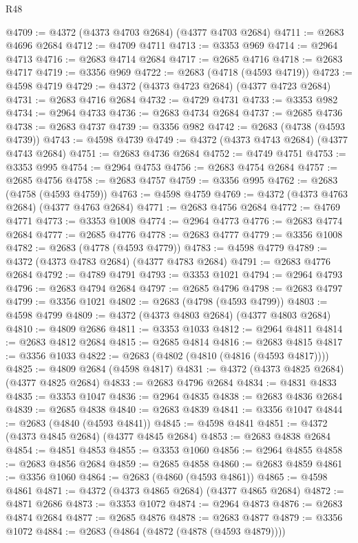 \begin{lexlean}{R48}
\begin{coremodule}
@4709 := @4372 (@4373 @4703 @2684) (@4377 @4703 @2684)
@4711 := @2683 @4696 @2684
@4712 := @4709 @4711
@4713 := @3353 @969
@4714 := @2964 @4713
@4716 := @2683 @4714 @2684
@4717 := @2685 @4716
@4718 := @2683 @4717
@4719 := @3356 @969
@4722 := @2683 (@4718 (@4593 @4719))
@4723 := @4598 @4719
@4729 := @4372 (@4373 @4723 @2684) (@4377 @4723 @2684)
@4731 := @2683 @4716 @2684
@4732 := @4729 @4731
@4733 := @3353 @982
@4734 := @2964 @4733
@4736 := @2683 @4734 @2684
@4737 := @2685 @4736
@4738 := @2683 @4737
@4739 := @3356 @982
@4742 := @2683 (@4738 (@4593 @4739))
@4743 := @4598 @4739
@4749 := @4372 (@4373 @4743 @2684) (@4377 @4743 @2684)
@4751 := @2683 @4736 @2684
@4752 := @4749 @4751
@4753 := @3353 @995
@4754 := @2964 @4753
@4756 := @2683 @4754 @2684
@4757 := @2685 @4756
@4758 := @2683 @4757
@4759 := @3356 @995
@4762 := @2683 (@4758 (@4593 @4759))
@4763 := @4598 @4759
@4769 := @4372 (@4373 @4763 @2684) (@4377 @4763 @2684)
@4771 := @2683 @4756 @2684
@4772 := @4769 @4771
@4773 := @3353 @1008
@4774 := @2964 @4773
@4776 := @2683 @4774 @2684
@4777 := @2685 @4776
@4778 := @2683 @4777
@4779 := @3356 @1008
@4782 := @2683 (@4778 (@4593 @4779))
@4783 := @4598 @4779
@4789 := @4372 (@4373 @4783 @2684) (@4377 @4783 @2684)
@4791 := @2683 @4776 @2684
@4792 := @4789 @4791
@4793 := @3353 @1021
@4794 := @2964 @4793
@4796 := @2683 @4794 @2684
@4797 := @2685 @4796
@4798 := @2683 @4797
@4799 := @3356 @1021
@4802 := @2683 (@4798 (@4593 @4799))
@4803 := @4598 @4799
@4809 := @4372 (@4373 @4803 @2684) (@4377 @4803 @2684)
@4810 := @4809 @2686
@4811 := @3353 @1033
@4812 := @2964 @4811
@4814 := @2683 @4812 @2684
@4815 := @2685 @4814
@4816 := @2683 @4815
@4817 := @3356 @1033
@4822 := @2683 (@4802 (@4810 (@4816 (@4593 @4817))))
@4825 := @4809 @2684 (@4598 @4817)
@4831 := @4372 (@4373 @4825 @2684) (@4377 @4825 @2684)
@4833 := @2683 @4796 @2684
@4834 := @4831 @4833
@4835 := @3353 @1047
@4836 := @2964 @4835
@4838 := @2683 @4836 @2684
@4839 := @2685 @4838
@4840 := @2683 @4839
@4841 := @3356 @1047
@4844 := @2683 (@4840 (@4593 @4841))
@4845 := @4598 @4841
@4851 := @4372 (@4373 @4845 @2684) (@4377 @4845 @2684)
@4853 := @2683 @4838 @2684
@4854 := @4851 @4853
@4855 := @3353 @1060
@4856 := @2964 @4855
@4858 := @2683 @4856 @2684
@4859 := @2685 @4858
@4860 := @2683 @4859
@4861 := @3356 @1060
@4864 := @2683 (@4860 (@4593 @4861))
@4865 := @4598 @4861
@4871 := @4372 (@4373 @4865 @2684) (@4377 @4865 @2684)
@4872 := @4871 @2686
@4873 := @3353 @1072
@4874 := @2964 @4873
@4876 := @2683 @4874 @2684
@4877 := @2685 @4876
@4878 := @2683 @4877
@4879 := @3356 @1072
@4884 := @2683 (@4864 (@4872 (@4878 (@4593 @4879))))

\end{coremodule}
\end{lexlean}
